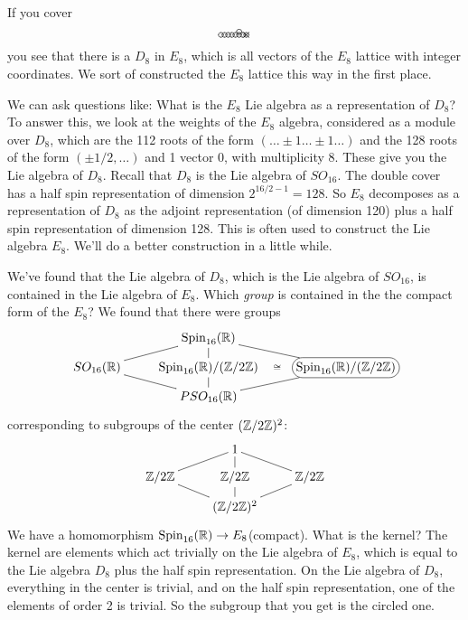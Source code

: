  If you cover
 \[\begin{xy}
   (0,0) *\cir<2pt>{};
   p+(1,0) *\cir<2pt>{} **@{-};
   p+(1,0) *\cir<2pt>{} **@{-};
   p+(1,0) *\cir<2pt>{} **@{-};
   p+(1,0) *\cir<2pt>{} **@{-};
   p+(1,0) *\cir<2pt>{} **@{-};
   p+(0,1) *\cir<2pt>{} **@{-},
   p+(1,0) *\cir<2pt>{} **@{-};
   p+(1,0) *{\times} *\cir<2pt>{} **@{-};
 \end{xy} \]
 you see that there is a $D_8$ in $E_8$, which is all vectors of the $E_8$ lattice
 with integer coordinates. We sort of constructed the $E_8$ lattice this way in the
 first place.

 We can ask questions like: What is the $E_8$ Lie algebra as a representation of
 $D_8$? To answer this, we look at the weights of the $E_8$ algebra, considered as a
 module over $D_8$, which are the 112 roots of the form $(\dots\pm 1\dots \pm 1\dots)$
 and the 128 roots of the form $(\pm 1/2,\dots)$ and 1 vector 0, with multiplicity 8.
 These give you the Lie algebra of $D_8$. Recall that $D_8$ is the Lie algebra of
 $SO_{16}$. The double cover has a half spin representation of dimension $2^{16/2
 -1}=128$. So $E_8$ decomposes as a representation of $D_8$ as the adjoint
 representation (of dimension 120) plus a half spin representation of dimension 128.
 This is often used to construct the Lie algebra $E_8$. We'll do a better construction
 in a little while.

 We've found that the Lie algebra of $D_8$, which is the Lie algebra of $SO_{16}$, is
 contained in the Lie algebra of $E_8$. Which \emph{group} is contained in the the compact
 form of the $E_8$? We found that there were groups
 \[\xymatrix @R=.75em {
   & \spin_{16}(\RR) \ar@{-}[dl] \ar@{-}[d] \ar@{-}[dr]\\
   SO_{16}(\RR) \ar@{-}[dr]& \spin_{16}(\RR)/(\ZZ/2\ZZ) \ar@{-}[d] \ar@{}[r]|{\cong}
   & *+[F-:<10pt>]{\spin_{16}(\RR)/(\ZZ/2\ZZ)}  \ar@{-}[dl]\\
   & PSO_{16}(\RR)
 }\]
 corresponding to subgroups of the center $(\mathbb{Z}/2\mathbb{Z})^2$:
 \[\xymatrix @R=.75em {
   & 1 \ar@{-}[dl] \ar@{-}[d] \ar@{-}[dr]\\
   \ZZ/2\ZZ \ar@{-}[dr]& \ZZ/2\ZZ \ar@{-}[d]& \ZZ/2\ZZ \ar@{-}[dl]\\
   & (\ZZ/2\ZZ)^2
 }\]
 We have a homomorphism $\operatorname{Spin}_{16}(\mathbb{R})\to E_8$(compact). What is the kernel? The
 kernel are elements which act trivially on the Lie algebra of $E_8$, which is equal
 to the Lie algebra $D_8$ plus the half spin representation. On the Lie algebra of
 $D_8$, everything in the center is trivial, and on the half spin representation, one
 of the elements of order 2 is trivial. So the subgroup that you get is the circled
 one.


